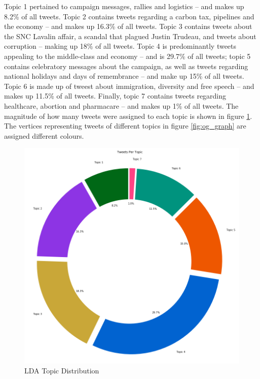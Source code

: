 Topic 1 pertained to campaign messages, rallies and logistics -- and makes up
8.2\% of all tweets. Topic 2 contains tweets regarding a carbon tax, pipelines
and the economy -- and makes up 16.3\% of all tweets. Topic 3 contains tweets
about the SNC Lavalin affair, a scandal that plagued Justin Trudeau, and tweets
about corruption -- making up 18\% of all tweets. Topic 4 is predominantly
tweets appealing to the middle-class and economy -- and is 29.7\% of all tweets;
topic 5 contains celebratory messages about the campaign, as well as tweets
regarding national holidays and days of remembrance -- and make up 15\% of all
tweets. Topic 6 is made up of tweest about immigration, diversity and free
speech -- and makes up 11.5\% of all tweets. Finally, topic 7 contains
tweets regarding healthcare, abortion and pharmacare -- and makes up 1\% of all
tweets. The magnitude of how many tweets were assigned to each topic is shown in
figure \ref{fig:topic_distribution}. The vertices representing tweets of different
topics in figure \ref{fig:og_graph} are assigned different colours. 

\begin{singlespacing}
    \begin{figure}[H]
    \centering
    \includegraphics[scale=0.2]{Figures/topic_distribution}
    \caption[LDA Topic Distribution]{LDA Topic Distribution}
    \label{fig:topic_distribution}
    \end{figure}
\end{singlespacing}






